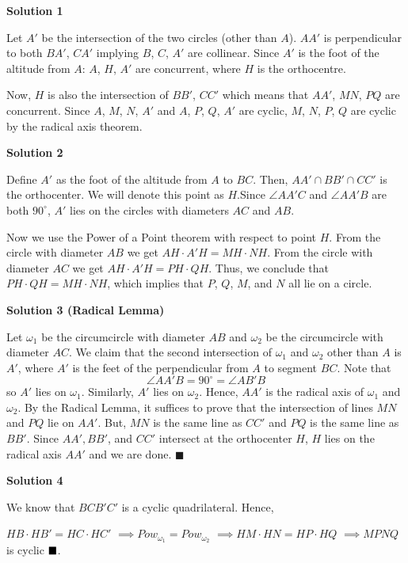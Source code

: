\begin{enumerate}
 



\textbf{Solution 1}

Let $A'$ be the intersection of the two circles (other than $A$). $AA'$ is perpendicular to both $BA'$, $CA'$ implying $B$, $C$, $A'$ are collinear. Since $A'$ is the foot of the altitude from $A$: $A$, $H$, $A'$ are concurrent, where $H$ is the orthocentre.

 Now, $H$ is also the intersection of $BB'$, $CC'$ which means that $AA'$, $MN$, $PQ$ are concurrent. Since $A$, $M$, $N$, $A'$ and $A$, $P$, $Q$, $A'$ are cyclic, $M$, $N$, $P$, $Q$ are cyclic by the radical axis theorem.

 



\textbf{Solution 2}

Define $A'$ as the foot of the altitude from $A$ to $BC$. Then, $AA' \cap BB' \cap CC'$ is the orthocenter. We will denote this point as $H$.Since $\angle AA'C$ and $\angle AA'B$ are both $90^{\circ}$, $A'$ lies on the circles with diameters $AC$ and $AB$.

 Now we use the Power of a Point theorem with respect to point $H$. From the circle with diameter $AB$ we get $AH \cdot A'H = MH \cdot NH$. From the circle with diameter $AC$ we get $AH \cdot A'H = PH \cdot QH$. Thus, we conclude that $PH \cdot QH = MH \cdot NH$, which implies that $P$, $Q$, $M$, and $N$ all lie on a circle.

 



\textbf{Solution 3 (Radical Lemma)}

Let $\omega_1$ be the circumcircle with diameter $AB$ and $\omega_2$ be the circumcircle with diameter $AC$.  We claim that the second intersection of $\omega_1$ and $\omega_2$ other than $A$ is $A'$, where $A'$ is the feet of the perpendicular from $A$ to segment $BC$.  Note that 
 \[\angle AA'B=90^{\circ}=\angle AB'B\] so $A'$ lies on $\omega_1.$  Similarly, $A'$ lies on $\omega_2$.  Hence, $AA'$ is the radical axis of $\omega_1$ and $\omega_2$.  By the Radical Lemma, it suffices to prove that the intersection of lines $MN$ and $PQ$ lie on $AA'$.  But, $MN$ is the same line as $CC'$ and $PQ$ is the same line as $BB'$.  Since $AA', BB'$, and $CC'$ intersect at the orthocenter $H$, $H$ lies on the radical axis $AA'$ and we are done. $\blacksquare$




\textbf{Solution 4}

We know that $BCB'C'$ is a cyclic quadrilateral. Hence, 

 $HB \cdot HB' = HC \cdot HC'$
$\implies Pow_{\omega_{1}} = Pow_{\omega_{2}}$
$\implies HM \cdot HN = HP \cdot HQ$
$\implies MPNQ$ is cyclic $\raggedright\blacksquare$.

 


\end{enumerate}